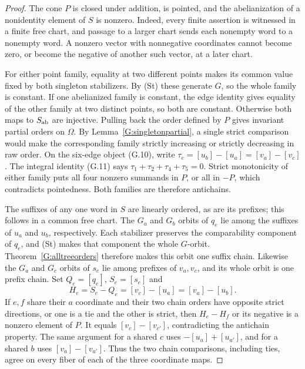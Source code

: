 \begin{proof}
The cone $P$ is closed under addition, is pointed, and the
abelianization of a nonidentity element of $S$ is nonzero.
Indeed, every finite assertion is witnessed in a finite free
chart, and passage to a larger chart sends each nonempty word
to a nonempty word. A nonzero vector with nonnegative coordinates
cannot become zero, or become the negative of another such
vector, at a later chart.

For either point family, equality at two different points makes
its common value fixed by both singleton stabilizers. By (St)
these generate $G$, so the whole family is constant. If one
abelianized family is constant, the edge identity gives equality
of the other family at two distinct points, so both are constant.
Otherwise both maps to $S_{\mathrm{ab}}$ are injective. Pulling back the
order defined by $P$ gives invariant partial orders on $\Omega$.
By Lemma~\ref{G:singletonpartial}, a single strict comparison
would make the corresponding family strictly increasing or
strictly decreasing in raw order. On the six-edge object
(G.10), write $\tau_e=[u_b]-[u_a]=[v_a]-[v_c]$.
The integral identity (G.11) says
$\tau_1+\tau_2+\tau_4+\tau_5=0$.
Strict monotonicity of either family puts all four nonzero
summands in $P$, or all in $-P$, which contradicts pointedness.
Both families are therefore antichains.

The suffixes of any one word in $S$ are linearly ordered,
as are its prefixes; this follows in a common free chart.
The $G_a$ and $G_b$ orbits of $q_e$ lie among the suffixes
of $u_a$ and $u_b$, respectively. Each stabilizer preserves
the comparability component of $q_e$, and (St) makes that
component the whole $G$-orbit. Theorem~\ref{G:alltreeorders}
therefore makes this orbit one suffix chain. Likewise the
$G_a$ and $G_c$ orbits of $s_e$ lie among prefixes of
$v_a,v_c$, and its whole orbit is one prefix chain.
Set $Q_e=[q_e]$, $S_e=[s_e]$ and
\[
 H_e=S_e-Q_e=[v_c]-[u_a]=[v_a]-[u_b].
\]
If $e,f$ share their $a$ coordinate and their two chain orders
have opposite strict directions, or one is a tie and the other
is strict, then $H_e-H_f$ or its negative is a nonzero element
of $P$. It equals $[v_c]-[v_{c'}]$, contradicting the antichain
property. The same argument for a shared $c$ uses
$-[u_a]+[u_{a'}]$, and for a shared $b$ uses
$[v_a]-[v_{a'}]$. Thus the two chain comparisons, including
ties, agree on every fiber of each of the three coordinate maps.


\end{proof}
